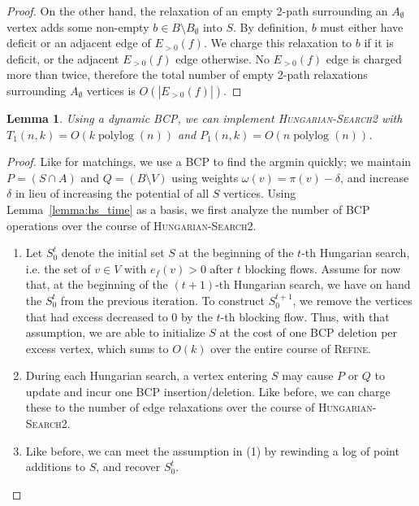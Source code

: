 \documentclass[11pt]{article}
\def\polylog{\mathop{\mathrm{polylog}}}
\theoremstyle{plain}
\newtheorem{lemma}{Lemma}
\begin{document}
\begin{figure*}
\begin{proof}
On the other hand, the relaxation of an empty 2-path surrounding an
$A_\emptyset$ vertex adds some non-empty $b \in B \setminus B_\emptyset$ into
$S$.
By definition, $b$ must either have deficit or an adjacent edge of $E_{>0}(f)$.
We charge this relaxation to $b$ if it is deficit, or the adjacent $E_{>0}(f)$
edge otherwise.
No $E_{>0}(f)$ edge is charged more than twice, therefore the total number of
empty 2-path relaxations surrounding $A_\emptyset$ vertices is
$O(|E_{>0}(f)|)$.
\end{proof}







\begin{lemma}
\label{lemma:goldberg_hs_time}
Using a dynamic BCP, we can implement \textsc{Hungarian-Search2} with
$T_1(n, k) = O(k\polylog(n))$ and $P_1(n, k) = O(n\polylog(n))$.
\end{lemma}

\begin{proof}
Like for matchings, we use a BCP to find the argmin quickly; we maintain
$P = (S \cap A)$ and $Q = (B \setminus V)$ using weights
$\omega(v) = \pi(v) - \delta$, and increase $\delta$ in lieu of increasing the
potential of all $S$ vertices.
Using Lemma~\ref{lemma:hs_time} as a basis, we first analyze the number of BCP
operations over the course of \textsc{Hungarian-Search2}.
\begin{enumerate}
\item Let $S^t_0$ denote the initial set $S$ at the beginning of the
	$t$-th Hungarian search, i.e. the set of $v \in V$ with
	$e_f(v) > 0$ after $t$ blocking flows.
	Assume for now that, at the beginning of the $(t+1)$-th
	Hungarian search, we have on hand the $S^t_0$ from the
	previous iteration.
	To construct $S^{t+1}_0$, we remove the vertices that had
	excess decreased to 0 by the $t$-th blocking flow.
	Thus, with that assumption, we are able to initialize $S$ at
	the cost of one BCP deletion per excess vertex, which sums to
	$O(k)$ over the entire course of \textsc{Refine}.
\item During each Hungarian search, a vertex entering $S$ may cause $P$
	or $Q$ to update and incur one BCP insertion/deletion.
	Like before, we can charge these to the number of edge
	relaxations over the course of \textsc{Hungarian-Search2}.
\item Like before, we can meet the assumption in (1) by rewinding a log
	of point additions to $S$, and recover $S^t_0$.
\end{enumerate}










\end{proof}
\end{figure*}
\end{document}
